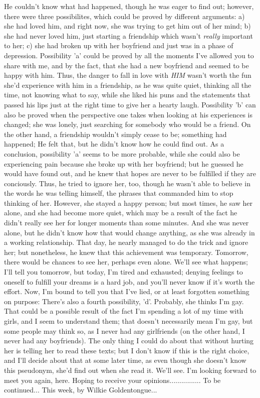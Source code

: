 He couldn't know what had happened, though he was eager to find out; however, there were three possibilites, which could be proved by different arguments: 
a) she had loved him, and right now, she was trying to get him out of her mind;
b) she had never loved him, just starting a friendship which wasn't \emph{really} important to her;
c) she had broken up with her boyfriend and just was in a phase of depression. 
Possibility 'a' could be proved by all the moments I've allowed you to share with me, and by the fact, that she had a new boyfriend and seemed to be happy with him. Thus, the danger to fall in love with \emph{HIM} wasn't worth the fun she'd experience with him in a friendship, as he was quite quiet, thinking all the time, not knowing what to say, while she liked his puns and the statements that passed his lips just at the right time to give her a hearty laugh. 
Possibility 'b' can also be proved when the perspective one takes when looking at his experiences is changed; she was lonely, just searching for somebody who would be a friend. On the other hand, a friendship wouldn't simply cease to be; something had happened; He felt that, but he didn't know how he could find out. 
As a conclusion, possibility 'a' seems to be more probable, while she could also be experiencing pain because she broke up with her boyfriend; but he guessed he would have found out, and he knew that hopes are never to be fulfilled if they are conciously. Thus, he tried to ignore her, too, though he wasn't able to believe in the words he was telling himself, the phrases that commanded him to stop thinking of her. However, she stayed a happy person; but most times, he saw her alone, and she had become more quiet, which may be a result of the fact he didn't really see her for longer moments than some minutes. 
And she was never alone, but he didn't know how that would change anything, as she was already in a working relationship. 
That day, he nearly managed to do the trick and ignore her; but nonetheless, he knew that this achievement was temporary. Tomorrow, there would be chances to see her, perhaps even alone. 
We'll see what happens; I'll tell you tomorrow, but today, I'm tired and exhausted; denying feelings to oneself to fulfill your dreams is a hard job, and you'll never know if it's worth the effort. 
Now, I'm bound to tell you that I've lied, or at least forgotten something on purpose: There's also a fourth possibility, 'd'. 
Probably, she thinks I'm gay. 
That could be a possible result of the fact I'm spending a lot of my time with girls, and I seem to understand them; that doesn't necessarily mean I'm gay, but some people may think so, as I never had any girlfriends (on the other hand, I never had any boyfriends). The only thing I could do about that without hurting her is telling her to read these texts; but I don't know if this is the right choice, and I'll decide about that at some later time, as even though she doesn't know this pseudonym, she'd find out when she read it. 
We'll see. 
I'm looking forward to meet you again, here. 
Hoping to receive your opinions................
To be continued...
This week, by Wilkie Goldentongue...

